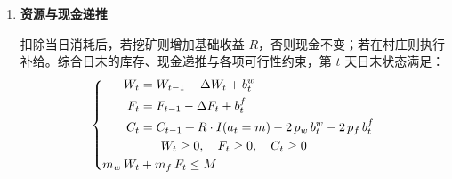 \documentclass{cumcmthesis}
\numberwithin{equation}{section}
\numberwithin{figure}{section}
\numberwithin{table}{section}
\begin{document}
\begin{enumerate}
\begin{enumerate}
\hspace*{2em}于是第 $t$ 天水、食物的实际消耗量等于基础消耗量的 $\kappa(a_t)$ 倍：

\vspace{-15pt}
\begin{equation}
\Delta W_t = \kappa(a_t)\,c_w(\omega_t),\qquad \Delta F_t = \kappa(a_t)\,c_f(\omega_t)
\label{eq:q1_consume}
\end{equation}

\hspace*{2em}行走动作仅在满足"移动边存在且当日非沙暴"两个条件时才可行，据此定义行走可行指示 $u_t^{\mathrm{w}}\in\{0,1\}$：

\vspace{-15pt}
\begin{equation}
u_t^{\mathrm{w}} = \mathbb{1}\!\left\{(i_{t},i_{t+1})\in E,\ \omega_t \neq \mathrm{X}\right\}
\label{eq:q1_move}
\end{equation}

\hspace*{2em}挖矿动作仅能在矿山节点执行，故：

\vspace{-15pt}
\begin{equation}
(a_t = \mathrm{m}) \ \Rightarrow\ i_{t} \in V_m
\label{eq:q1_mine}
\end{equation}

\hspace*{2em}式中 $c_w(\omega_t)$、$c_f(\omega_t)$ 分别为天气 $\omega_t$ 下每动作单位的水、食物基础消耗（符号表中 $S$、$H$、$X$ 分别表示晴朗、高温、沙暴），$E$ 为地图边集，$V_m$ 为矿山节点集合，$i_t$ 为第 $t$ 天日末所在区域，$\mathbb{1}\{\cdot\}$ 为指示函数（命题成立取 $1$，否则取 $0$）。式\eqref{eq:q1_kappa} 给出三种动作的消耗倍率；式\eqref{eq:q1_consume} 给出单日实际消耗；式\eqref{eq:q1_move} 规定行走可行当且仅当边 $(i_{t},i_{t+1})$ 存在于地图且当日非沙暴，从而沙暴日 $u_t^{\mathrm{w}}$ 自动取 $0$、禁止移动；式\eqref{eq:q1_mine} 限定挖矿只能发生在矿山节点。

            \item\textbf{资源与现金递推} 
            
            \hspace*{2em}扣除当日消耗后，若挖矿则增加基础收益 $R$，否则现金不变；若在村庄则执行补给。综合日末的库存、现金递推与各项可行性约束，第 $t$ 天日末状态满足：
\vspace{-5pt}
\begin{equation}
\left\{
\begin{aligned}
W_t &= W_{t-1} - \Delta W_t + b^w_t\\
F_t &= F_{t-1} - \Delta F_t + b^f_t\\
C_t &= C_{t-1} + R\cdot{I}(a_t = m) - 2\,p_w\,b^w_t - 2\,p_f\,b^f_t\\
&\hphantom{m_w\,}W_t \geq 0,\quad F_t \geq 0,\quad C_t \geq 0\\
m_w\,W_t &+ m_f\,F_t \leq M
\end{aligned}
\right.
\label{eq:q1_res}
\end{equation}


\end{enumerate}
\end{enumerate}
\end{document}
